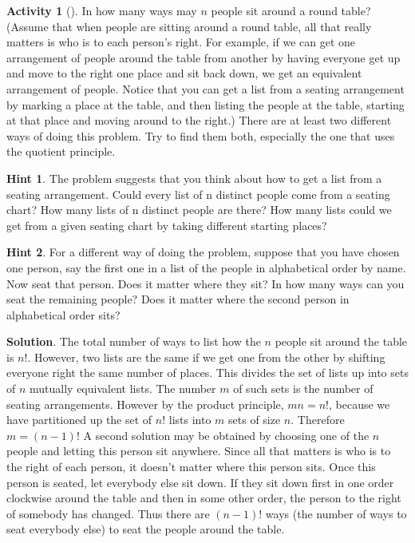 \documentclass[10pt,]{book}
\theoremstyle{plain}
\theoremstyle{definition}
\theoremstyle{definition}
\theoremstyle{definition}
\newtheorem{activity}[project]{Activity}
\numberwithin{equation}{chapter}
\begin{document}
\begin{activity}[]\label{roundtable}
\hypertarget{p-764}{}%
In how many ways may \(n\) people sit around a round table? (Assume that when people are sitting around a round table, all that really matters is who is to each person's right. For example, if we can get one arrangement of people around the table from another by having everyone get up and move to the right one place and sit back down, we get an equivalent arrangement of people. Notice that you can get a list from a seating arrangement by marking a place at the table, and then listing the people at the table, starting at that place and moving around to the right.) There are at least two different ways of doing this problem. Try to find them both, especially the one that uses the quotient principle.%
\par\smallskip%
\noindent\textbf{Hint 1}.\hypertarget{hint-63}{}\quad%
\hypertarget{p-765}{}%
The problem suggests that you think about how to get a list from a seating arrangement. Could every list of n distinct people come from a seating chart? How many lists of n distinct people are there? How many lists could we get from a given seating chart by taking different starting places?%
\par\smallskip%
\noindent\textbf{Hint 2}.\hypertarget{hint-64}{}\quad%
\hypertarget{p-766}{}%
For a different way of doing the problem, suppose that you have chosen one person, say the first one in a list of the people in alphabetical order by name. Now seat that person. Does it matter where they sit? In how many ways can you seat the remaining people? Does it matter where the second person in alphabetical order sits?%
\par\smallskip%
\noindent\textbf{Solution}.\hypertarget{solution-56}{}\quad%
\hypertarget{p-767}{}%
The total number of ways to list how the \(n\) people sit around the table is \(n!\). However, two lists are the same if we get one from the other by shifting everyone right the same number of places. This divides the set of lists up into sets of \(n\) mutually equivalent lists. The number \(m\) of such sets is the number of seating arrangements. However by the product principle, \(mn=n!\), because we have partitioned up the set of \(n!\) lists into \(m\) sets of size \(n\). Therefore \(m=(n-1)!\) A second solution may be obtained by choosing one of the \(n\) people and letting this person sit anywhere. Since all that matters is who is to the right of each person, it doesn't matter where this person sits. Once this person is seated, let everybody else sit down. If they sit down first in one order clockwise around the table and then in some other order, the person to the right of somebody has changed. Thus there are \((n-1)!\) ways (the number of ways to seat everybody else) to seat the people around the table.%
\end{activity}
\end{document}
